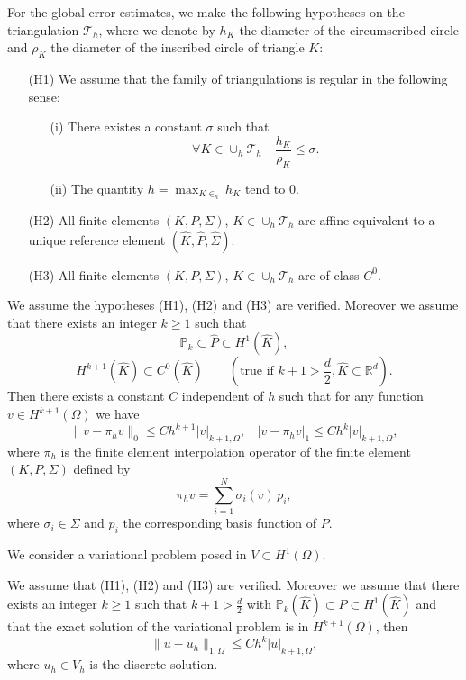 For the global error estimates, we make the following hypotheses
on the triangulation $ \mathcal{T} _h$, where we denote by $h_K$ the diameter of the circumscribed circle and $\rho_K$ the diameter of the inscribed circle of triangle $K$:
\begin{itemize}
\item[(H1)] We assume that the family of triangulations is regular in the following sense:
  \begin{itemize}
  \item[(i)] There existes a constant $\sigma$ such that
    $$\forall K\in\cup_h \mathcal{T}_h\quad \frac{h_K}{\rho_K}\leq\sigma.$$
  \item[(ii)] The quantity $\displaystyle h=\max_{K\in _h} h_K$ tend to 0.
  \end{itemize}
\item[(H2)]  All finite elements $(K,P,\Sigma)$, $K\in\cup_h\mathcal{T}_h$ are affine
equivalent to a unique reference element $(\hat{K},\hat{P},\hat{\Sigma})$.
\item[(H3)]  All finite elements $(K,P,\Sigma)$, $K\in\cup_h\mathcal{T}_h$ are of class
$C^0$.
\end{itemize}
\begin{theorem}
  We assume the hypotheses (H1), (H2) and (H3) are verified. Moreover we
assume that there exists an integer $k\geq 1$ such that
$$ \mathbb{P}_k\subset\hat{P}\subset H^1(\hat{K}),$$
$$H^{k+1}(\hat{K})\subset C^0(\hat{K})\qquad (\mbox{true if }k+1>\frac d2, \hat{K}\subset \mathbb{R}^d).$$
Then there exists a constant $C$ independent of $h$ such that for any function
 $v\in H^{k+1}(\Omega)$ we have
$$\|v-\pi_h v\|_{0}\leq Ch^{k+1}|v|_{k+1,\Omega}, ~~~~ |v-\pi_h v|_{1}\leq Ch^k|v|_{k+1,\Omega},$$
where $\pi_h$ is the finite element interpolation operator of the finite element $(K,P,\Sigma)$
defined by
$$\pi_h v=\sum_{i=1}^N \sigma_i(v)\,p_i,$$
where $\sigma_i \in \Sigma$ and $p_i$ the corresponding basis function of $P$. 
\end{theorem}



We consider a variational problem posed in  $V\subset H^1(\Omega)$.
\begin{theorem}
 We assume that (H1), (H2) and (H3) are verified. Moreover we assume that there exists an integer
 $k\geq 1$ such that $k+1>\frac d2$ with $\mathbb{P}_k(\hat{K})\subset P \subset
H^1(\hat{K})$ and that the exact solution of the variational problem is in
$H^{k+1}(\Omega)$, then
$$ \|u-u_h \|_{1,\Omega}\leq C h^{k}|u|_{k+1,\Omega},$$
where $u_h\in V_h$ is the discrete solution.
\end{theorem}

